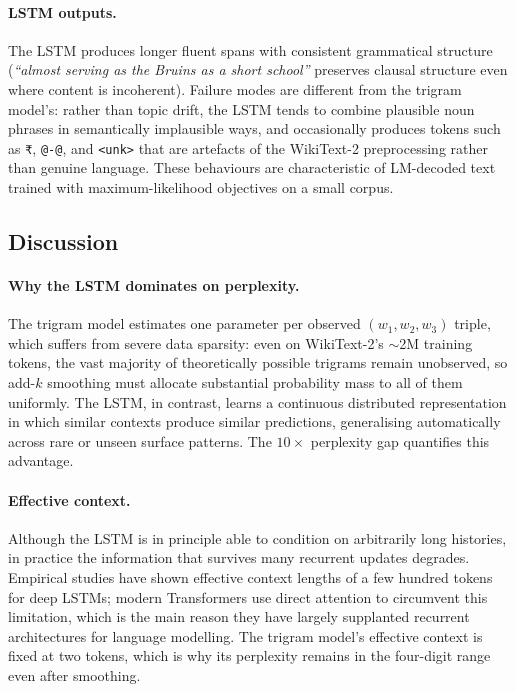 \paragraph{LSTM outputs.}
The LSTM produces longer fluent spans with consistent grammatical
structure (\textit{``almost serving as the Bruins as a short school''}
preserves clausal structure even where content is incoherent). Failure
modes are different from the trigram model's: rather than topic drift,
the LSTM tends to combine plausible noun phrases in semantically
implausible ways, and occasionally produces tokens such as \texttt{₹},
\texttt{@-@}, and \texttt{<unk>} that are artefacts of the WikiText-2
preprocessing rather than genuine language. These behaviours are
characteristic of LM-decoded text trained with maximum-likelihood
objectives on a small corpus.

\subsection{Discussion}

\paragraph{Why the LSTM dominates on perplexity.}
The trigram model estimates one parameter per observed $(w_1, w_2,
w_3)$ triple, which suffers from severe data sparsity: even on
WikiText-2's $\sim$2M training tokens, the vast majority of
theoretically possible trigrams remain unobserved, so add-$k$ smoothing
must allocate substantial probability mass to all of them uniformly.
The LSTM, in contrast, learns a continuous distributed representation
in which similar contexts produce similar predictions, generalising
automatically across rare or unseen surface patterns. The
$10\times$ perplexity gap quantifies this advantage.

\paragraph{Effective context.}
Although the LSTM is in principle able to condition on arbitrarily long
histories, in practice the information that survives many recurrent
updates degrades. Empirical studies have shown effective context
lengths of a few hundred tokens for deep LSTMs; modern Transformers use
direct attention to circumvent this limitation, which is the main
reason they have largely supplanted recurrent architectures for
language modelling. The trigram model's effective context is fixed at
two tokens, which is why its perplexity remains in the four-digit range
even after smoothing.


